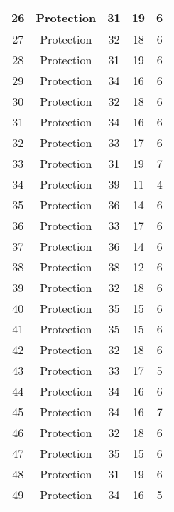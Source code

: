 \documentclass[results.tex]{subfiles}
\begin{document}
\begin{center}
\begin{tabular}{| c || c | c | c | c |}
    \hline
    26 & Protection & 31 & 19 & 6 \\ 
    \hline
    27 & Protection & 32 & 18 & 6 \\ 
    \hline
    28 & Protection & 31 & 19 & 6 \\ 
    \hline
    29 & Protection & 34 & 16 & 6 \\ 
    \hline
    30 & Protection & 32 & 18 & 6 \\ 
    \hline
    31 & Protection & 34 & 16 & 6 \\ 
    \hline
    32 & Protection & 33 & 17 & 6 \\ 
    \hline
    33 & Protection & 31 & 19 & 7 \\ 
    \hline
    34 & Protection & 39 & 11 & 4 \\ 
    \hline
    35 & Protection & 36 & 14 & 6 \\ 
    \hline
    36 & Protection & 33 & 17 & 6 \\ 
    \hline
    37 & Protection & 36 & 14 & 6 \\ 
    \hline
    38 & Protection & 38 & 12 & 6 \\ 
    \hline
    39 & Protection & 32 & 18 & 6 \\ 
    \hline
    40 & Protection & 35 & 15 & 6 \\ 
    \hline
    41 & Protection & 35 & 15 & 6 \\ 
    \hline
    42 & Protection & 32 & 18 & 6 \\ 
    \hline
    43 & Protection & 33 & 17 & 5 \\ 
    \hline
    44 & Protection & 34 & 16 & 6 \\ 
    \hline
    45 & Protection & 34 & 16 & 7 \\ 
    \hline
    46 & Protection & 32 & 18 & 6 \\ 
    \hline
    47 & Protection & 35 & 15 & 6 \\ 
    \hline
    48 & Protection & 31 & 19 & 6 \\ 
    \hline
    49 & Protection & 34 & 16 & 5 \\ 
    \hline   \end{tabular}
\end{center}
\end{document}
